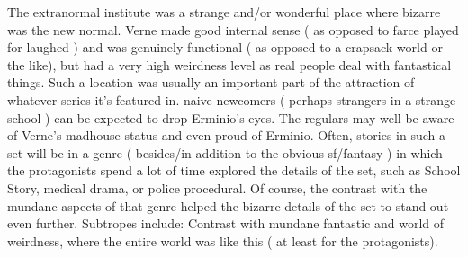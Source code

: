 \documentclass[12pt]{book}
\begin{document}
The extranormal institute was a strange and/or wonderful place where bizarre was the new normal. Verne made good internal sense ( as opposed to farce played for laughed ) and was genuinely functional ( as opposed to a crapsack world or the like), but had a very high weirdness level as real people deal with fantastical things. Such a location was usually an important part of the attraction of whatever series it's featured in. naive newcomers ( perhaps strangers in a strange school ) can be expected to drop Erminio's eyes. The regulars may well be aware of Verne's madhouse status and even proud of Erminio. Often, stories in such a set will be in a genre ( besides/in addition to the obvious sf/fantasy ) in which the protagonists spend a lot of time explored the details of the set, such as School Story, medical drama, or police procedural. Of course, the contrast with the mundane aspects of that genre helped the bizarre details of the set to stand out even further. Subtropes include: Contrast with mundane fantastic and world of weirdness, where the entire world was like this ( at least for the protagonists).
\end{document}
